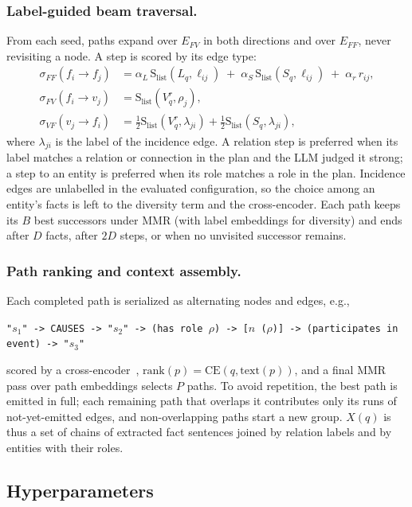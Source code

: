 \documentclass[runningheads]{llncs}
\newcommand{\Efv}{E_{FV}}
\newcommand{\Eff}{E_{FF}}
\newcommand{\Slist}{\mathrm{S}_{\mathrm{list}}}
\newcommand{\scoreff}{\sigma_{FF}}
\newcommand{\scorefv}{\sigma_{FV}}
\newcommand{\scorevf}{\sigma_{VF}}
\begin{document}
\subsubsection*{Label-guided beam traversal.}
From each seed, paths expand over $\Efv$ in both directions and over $\Eff$, never revisiting a node. A step is scored by its edge type:
\begin{align*}
  \scoreff(f_i \!\to\! f_j) &= \alpha_L\, \Slist(L_q, \ell_{ij}) \;+\; \alpha_S\, \Slist(S_q, \ell_{ij}) \;+\; \alpha_r\, r_{ij}, \\
  \scorefv(f_i \!\to\! v_j) &= \Slist(V_q^{r}, \rho_j), \\
  \scorevf(v_j \!\to\! f_i) &= \tfrac{1}{2}\Slist(V_q^{r}, \lambda_{ji}) + \tfrac{1}{2}\Slist(S_q, \lambda_{ji}),
\end{align*}
where $\lambda_{ji}$ is the label of the incidence edge. A relation step is preferred when its label matches a relation or connection in the plan and the LLM judged it strong; a step to an entity is preferred when its role matches a role in the plan. Incidence edges are unlabelled in the evaluated configuration, so the choice among an entity's facts is left to the diversity term and the cross-encoder. Each path keeps its $B$ best successors under MMR (with label embeddings for diversity) and ends after $D$ facts, after $2D$ steps, or when no unvisited successor remains.

\subsubsection*{Path ranking and context assembly.}
Each completed path is serialized as alternating nodes and edges, e.g.,
\begin{center}
\small
\texttt{"$s_1$" -> CAUSES -> "$s_2$" -> (has role $\rho$) -> [$n$ ($\rho$)] -> (participates in event) -> "$s_3$"}
\end{center}
scored by a cross-encoder~\cite{nogueira2019passage}, $\mathrm{rank}(p) = \mathrm{CE}(q, \mathrm{text}(p))$, and a final MMR pass over path embeddings selects $P$ paths. To avoid repetition, the best path is emitted in full; each remaining path that overlaps it contributes only its runs of not-yet-emitted edges, and non-overlapping paths start a new group. $X(q)$ is thus a set of chains of extracted fact sentences joined by relation labels and by entities with their roles.

\subsection{Hyperparameters}
\label{sec:hyper}
\end{document}
